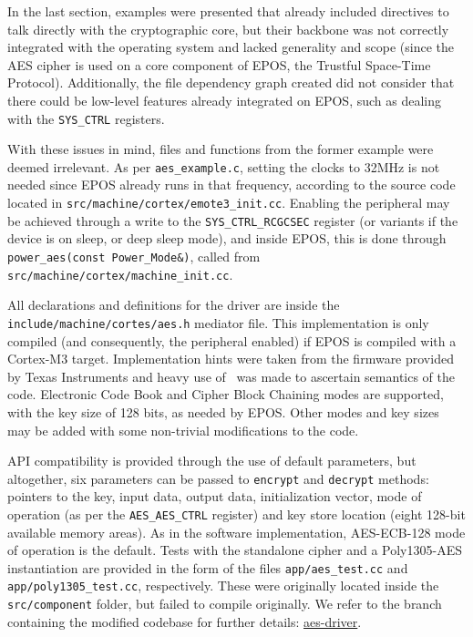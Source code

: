 \documentclass{../sftex/sftex}
\begin{document}
In the last section, examples were presented that already included directives
to talk directly with the cryptographic core, but their backbone was not
correctly integrated with the operating system and lacked generality and scope
(since the AES cipher is used on a core component of EPOS, the Trustful
Space-Time Protocol). Additionally, the file dependency graph created did not
consider that there could be low-level features already integrated on EPOS,
such as dealing with the \verb!SYS_CTRL! registers.

With these issues in mind, files and functions from the former example were
deemed irrelevant. As per \verb!aes_example.c!, setting the clocks to 32MHz is
not needed since EPOS already runs in that frequency, according to the source
code located in \verb!src/machine/cortex/emote3_init.cc!. Enabling the
peripheral may be achieved through a write to the \verb!SYS_CTRL_RCGCSEC!
register (or variants if the device is on sleep, or deep sleep mode), and
inside EPOS, this is done through \verb!power_aes(const Power_Mode&)!, called
from \verb!src/machine/cortex/machine_init.cc!.

All declarations and definitions for the driver are inside the
\verb!include/machine/cortes/aes.h! mediator file. This implementation is only
compiled (and consequently, the peripheral enabled) if EPOS is compiled with a
Cortex-M3 target. Implementation hints were taken from the firmware provided by
Texas Instruments and heavy use of~\cite{Texas:report:2013:may} was made to
ascertain semantics of the code. Electronic Code Book and Cipher Block Chaining
modes are supported, with the key size of 128 bits, as needed by EPOS\@. Other
modes and key sizes may be added with some non-trivial modifications to the
code.

API compatibility is provided through the use of default parameters, but
altogether, six parameters can be passed to \verb!encrypt! and \verb!decrypt!
methods: pointers to the key, input data, output data, initialization vector,
mode of operation (as per the \verb!AES_AES_CTRL! register) and key store
location (eight 128-bit available memory areas). As in the software
implementation, AES-ECB-128 mode of operation is the default. Tests with the
standalone cipher and a Poly1305-AES instantiation are provided in the form of
the files \verb!app/aes_test.cc! and \verb!app/poly1305_test.cc!, respectively.
These were originally located inside the \verb!src/component! folder, but
failed to compile originally. We refer to the branch containing the modified
codebase for further details:
\href{https://epos.lisha.ufsc.br/svn/makers/aes-driver/}{aes-driver}.
\end{document}
